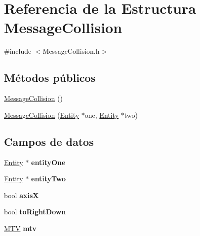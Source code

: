 \hypertarget{structMessageCollision}{}\section{Referencia de la Estructura Message\+Collision}
\label{structMessageCollision}


{\ttfamily \#include $<$Message\+Collision.\+h$>$}

\subsection*{Métodos públicos}
\begin{DoxyCompactItemize}
\item 
\hyperlink{structMessageCollision_a44839a184c023f6ed4e47a279461e6bb}{Message\+Collision} ()
\item 
\hyperlink{structMessageCollision_a21ea60559bfae3bfbd4a023c7fe22c0e}{Message\+Collision} (\hyperlink{classEntity}{Entity} $\ast$one, \hyperlink{classEntity}{Entity} $\ast$two)
\end{DoxyCompactItemize}
\subsection*{Campos de datos}
\begin{DoxyCompactItemize}
\item 
\hypertarget{structMessageCollision_a62c10863f20bc60c897b28a0f7ee7504}{}\hyperlink{classEntity}{Entity} $\ast$ {\bfseries entity\+One}\label{structMessageCollision_a62c10863f20bc60c897b28a0f7ee7504}

\item 
\hypertarget{structMessageCollision_a000ae9a1d028fcf81bc8267a1488876a}{}\hyperlink{classEntity}{Entity} $\ast$ {\bfseries entity\+Two}\label{structMessageCollision_a000ae9a1d028fcf81bc8267a1488876a}

\item 
\hypertarget{structMessageCollision_a7cdd3336fa1c71440bace93d4502d26d}{}bool {\bfseries axis\+X}\label{structMessageCollision_a7cdd3336fa1c71440bace93d4502d26d}

\item 
\hypertarget{structMessageCollision_a74b02eec08f1d2212946286f332e9d6e}{}bool {\bfseries to\+Right\+Down}\label{structMessageCollision_a74b02eec08f1d2212946286f332e9d6e}

\item 
\hypertarget{structMessageCollision_a7140773e9585bcc63fca2300177567ed}{}\hyperlink{classMTV}{M\+T\+V} {\bfseries mtv}\label{structMessageCollision_a7140773e9585bcc63fca2300177567ed}

\end{DoxyCompactItemize}


